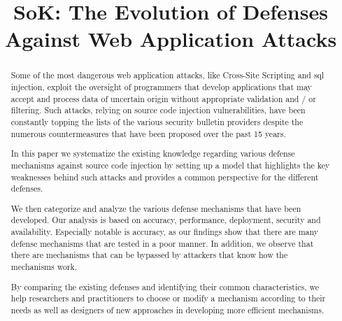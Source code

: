 \documentclass[conference]{IEEEtran}
\date{}
\begin{document}
\author{
}

\title{SoK: The Evolution of Defenses Against Web Application Attacks}

\maketitle
\begin{abstract}

  Some of the most dangerous web application attacks, like Cross-Site
  Scripting and {\sc sql} injection, exploit the oversight of
  programmers that develop applications that may accept and process
  data of uncertain origin without appropriate validation and / or
  filtering. Such attacks, relying on source code injection
  vulnerabilities, have been constantly topping the lists of the
  various security bulletin providers despite the numerous
  countermeasures that have been proposed over the past 15 years.

  In this paper we systematize the existing knowledge regarding
  various defense mechanisms against source code injection by setting
  up a model that highlights the key weaknesses behind such attacks
  and provides a common perspective for the different defenses.

  We then categorize and analyze the various defense mechanisms that
  have been developed. Our analysis is based on accuracy, performance,
  deployment, security and availability. Especially notable is
  accuracy, as our findings show that there are many defense
  mechanisms that are tested in a poor manner. In addition, we observe
  that there are mechanisms that can be bypassed by attackers that
  know how the mechanisms work.

  By comparing the existing defenses and identifying their common
  characteristics, we help researchers and practitioners to choose or
  modify a mechanism according to their needs as well as designers of
  new approaches in developing more efficient mechanisms.

\end{abstract}
\end{document}
